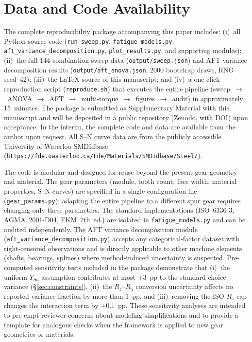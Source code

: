 \documentclass[12pt,a4paper]{article}
\begin{document}
\section*{Data and Code Availability}

The complete reproducibility package accompanying this paper includes:
(i)~all Python source code (\texttt{run\_sweep.py},
\texttt{fatigue\_models.py}, \texttt{aft\_variance\_decomposition.py},
\texttt{plot\_results.py}, and supporting modules);
(ii)~the full 144-combination sweep data
(\texttt{output/sweep.json}) and AFT variance decomposition results
(\texttt{output/aft\_anova.json}, 2000 bootstrap draws, RNG seed~42);
(iii)~the LaTeX source of this manuscript; and
(iv)~a one-click reproduction script (\texttt{reproduce.sh}) that
executes the entire pipeline (sweep~$\rightarrow$~ANOVA~$\rightarrow$~AFT~$\rightarrow$~multi-torque~$\rightarrow$~figures~$\rightarrow$~audit)
in approximately 15~minutes.
The package is submitted as Supplementary Material with this
manuscript and will be deposited in a public repository (Zenodo,
with DOI) upon acceptance. In the interim, the complete code and
data are available from the author upon request. All S--N curve data are from the
publicly accessible University of Waterloo SMDIdbase
(\texttt{https://fde.uwaterloo.ca/Fde/Materials/SMDIdbase/Steel/}).

The code is modular and designed for reuse beyond the present gear
geometry and material. The gear parameters (module, tooth count, face
width, material properties, S--N curves) are specified in a single
configuration file (\texttt{gear\_params.py}); adapting the entire
pipeline to a different spur gear requires changing only these
parameters. The standard implementations (ISO~6336-3, AGMA~2001-D04,
FKM~7th~ed.) are isolated in \texttt{fatigue\_models.py} and can be
audited independently. The AFT variance decomposition module
(\texttt{aft\_variance\_decomposition.py}) accepts any
categorical-factor dataset with right-censored observations and is
directly applicable to other machine elements (shafts, bearings,
splines) where method-induced uncertainty is suspected. Pre-computed
sensitivity tests included in the package demonstrate that (i)~the
uniform $Y_{Sa}$ assumption contributes at most $\pm$3~pp to the
standard-choice variance (\S\ref{sec:constraints}), (ii)~the
$R_z$--$R_a$ conversion uncertainty affects no reported variance
fraction by more than 1~pp, and (iii)~removing the ISO $R_z$ cap
changes the interaction term by $+0.1$~pp. These sensitivity analyses
are intended to pre-empt reviewer concerns about modeling
simplifications and to provide a template for analogous checks when
the framework is applied to new gear geometries or materials.
\end{document}
